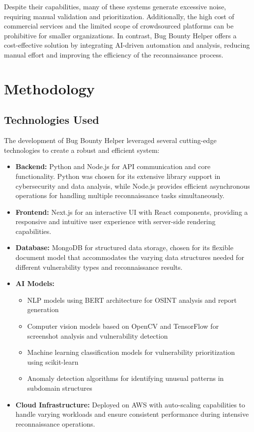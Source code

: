 \documentclass[conference]{IEEEtran}
\begin{document}
Despite their capabilities, many of these systems generate excessive noise, requiring manual validation and prioritization. Additionally, the high cost of commercial services and the limited scope of crowdsourced platforms can be prohibitive for smaller organizations. In contrast, Bug Bounty Helper offers a cost-effective solution by integrating AI-driven automation and analysis, reducing manual effort and improving the efficiency of the reconnaissance process.

\section{Methodology}
\subsection{Technologies Used}
The development of Bug Bounty Helper leveraged several cutting-edge technologies to create a robust and efficient system:

\begin{itemize}
    \item \textbf{Backend:} Python and Node.js for API communication and core functionality. Python was chosen for its extensive library support in cybersecurity and data analysis, while Node.js provides efficient asynchronous operations for handling multiple reconnaissance tasks simultaneously.
    
    \item \textbf{Frontend:} Next.js for an interactive UI with React components, providing a responsive and intuitive user experience with server-side rendering capabilities.
    
    \item \textbf{Database:} MongoDB for structured data storage, chosen for its flexible document model that accommodates the varying data structures needed for different vulnerability types and reconnaissance results.
    
    \item \textbf{AI Models:} 
    \begin{itemize}
        \item NLP models using BERT architecture for OSINT analysis and report generation
        \item Computer vision models based on OpenCV and TensorFlow for screenshot analysis and vulnerability detection
        \item Machine learning classification models for vulnerability prioritization using scikit-learn
        \item Anomaly detection algorithms for identifying unusual patterns in subdomain structures
    \end{itemize}
    
    \item \textbf{Cloud Infrastructure:} Deployed on AWS with auto-scaling capabilities to handle varying workloads and ensure consistent performance during intensive reconnaissance operations.
\end{itemize}
\end{document}
